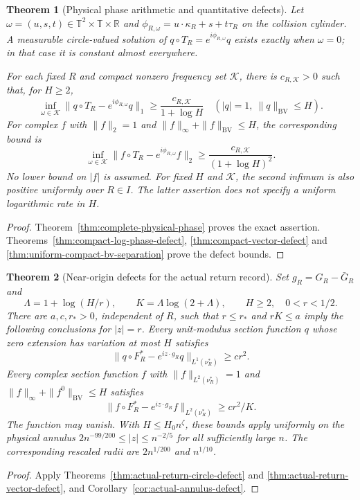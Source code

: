 \documentclass[11pt,reqno]{amsart}
\numberwithin{equation}{section}
\newtheorem{maintheorem}{Theorem}
\theoremstyle{definition}\newtheorem{definition}[theorem]{Definition}
\theoremstyle{remark}\newtheorem{remark}[theorem]{Remark}
\newcommand{\R}{\mathbb R}\newcommand{\Z}{\mathbb Z}\newcommand{\T}{\mathbb T}
\begin{document}
\begin{maintheorem}[Physical phase arithmetic and quantitative defects]
\label{thm:intro-quantitative-phases}
Let $\omega=(u,s,t)\in\T^2\times\T\times\R$ and
$\phi_{R,\omega}=u\cdot\kappa_R+s+t\tau_R$ on the collision cylinder.
A measurable circle-valued solution of
$q\circ T_R=e^{i\phi_{R,\omega}}q$ exists exactly when $\omega=0$;
in that case it is constant almost everywhere.

For each fixed $R$ and compact nonzero frequency set $\mathcal K$,
there is $c_{R,\mathcal K}>0$ such that, for $H\ge2$,
\[
 \inf_{\omega\in\mathcal K}
 \|q\circ T_R-e^{i\phi_{R,\omega}}q\|_1
                  \ge\frac{c_{R,\mathcal K}}{1+\log H}
 \quad (|q|=1,\ \|q\|_{\mathrm{BV}}\le H).
\]
For complex $f$ with $\|f\|_2=1$ and
$\|f\|_\infty+\|f\|_{\mathrm{BV}}\le H$, the corresponding bound is
\[
 \inf_{\omega\in\mathcal K}
 \|f\circ T_R-e^{i\phi_{R,\omega}}f\|_2
                  \ge\frac{c_{R,\mathcal K}}{(1+\log H)^2}.
\]
No lower bound on $|f|$ is assumed. For fixed $H$ and $\mathcal K$,
the second infimum is also positive uniformly over $R\in I$.
The latter assertion does not specify a uniform logarithmic rate in $H$.
\end{maintheorem}
\begin{proof}
Theorem~\ref{thm:complete-physical-phase} proves the exact assertion.
Theorems~\ref{thm:compact-log-phase-defect},
\ref{thm:compact-vector-defect} and
\ref{thm:uniform-compact-bv-separation} prove the defect bounds.
\end{proof}

\begin{maintheorem}[Near-origin defects for the actual return record]
\label{thm:intro-actual-return-defects}
Set $g_R=G_R-\bar G_R$ and
\[
 \Lambda=1+\log(H/r),\qquad K=\Lambda\log(2+\Lambda),
                 \qquad H\ge2,\quad 0<r<1/2.
\]
There are $a,c,r_*>0$, independent of $R$, such that $r\le r_*$
and $rK\le a$ imply the following conclusions for $|z|=r$.
Every unit-modulus section function $q$ whose zero extension has
variation at most $H$ satisfies
\[
 \|q\circ F_R^*-e^{iz\cdot g_R}q\|_{L^1(\nu_R^*)}\ge cr^2.
\]
Every complex section function $f$ with
$\|f\|_{L^2(\nu_R^*)}=1$ and
$\|f\|_\infty+\|f^0\|_{\mathrm{BV}}\le H$ satisfies
\[
 \|f\circ F_R^*-e^{iz\cdot g_R}f\|_{L^2(\nu_R^*)}
                                    \ge cr^2/K.
\]
The function may vanish. With $H\le H_0n^\zeta$, these bounds apply
uniformly on the physical annulus
$2n^{-99/200}\le|z|\le n^{-2/5}$ for all sufficiently large $n$.
The corresponding rescaled radii are $2n^{1/200}$ and $n^{1/10}$.
\end{maintheorem}
\begin{proof}
Apply Theorems~\ref{thm:actual-return-circle-defect} and
\ref{thm:actual-return-vector-defect}, and
Corollary~\ref{cor:actual-annulus-defect}.
\end{proof}
\end{document}
